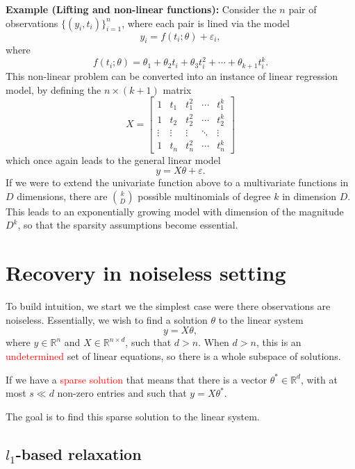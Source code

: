 \documentclass[10pt,handout,english]{beamer}
\newcommand{\R}{\mathbb{R}}
\begin{document}
\begin{frame}[allowframebreaks]
\textbf{Example (Lifting and non-linear functions):} Consider the $n$ pair of observations $\{(y_i,t_i)\}_{i=1}^n$, where each pair is lined via the model 
\[
y_i=f(t_i;\theta)+\varepsilon_i,
\]
where 
\[
f(t_i;\theta)=\theta_1+\theta_2t_i+\theta_3t_i^2+\cdots+\theta_{k+1}t_i^k.
\]
This non-linear problem can be converted into an instance of linear regression model, by defining the $n\times(k+1)$ matrix
\[
X=
\begin{bmatrix}
1&t_1&t_1^2&\cdots&t_1^k\\
1&t_2&t_2^2&\cdots&t_2^k\\
\vdots&\vdots&\vdots&\ddots&\vdots\\
1&t_n&t_n^2&\cdots&t_n^k
\end{bmatrix}
\]
which once again leads to the general linear model
\[
y=X\theta+\varepsilon.
\]
If we were to extend the univariate function above to a multivariate functions in  $D$ dimensions, there are $\binom{k}{D}$ possible multinomials of degree $k$ in dimension $D$. This leads to an exponentially growing model with dimension of the magnitude $D^k$, so that the sparsity assumptions become essential.
\end{frame}

\section{Recovery in noiseless setting}
\frame{\tableofcontents[currentsection]}

\begin{frame}[allowframebreaks]
To build intuition, we start we the simplest case were there observations are noiseless. Essentially, we wish to find a solution $\theta$ to the linear system
\[
y=X\theta,
\]
where $y\in\R^n$ and $X\in\R^{n\times d}$, such that $d>n$. When $d>n$, this is an \textcolor{red}{undetermined} set of linear equations, so there is a whole subspace of solutions. 

If we have a \textcolor{red}{sparse solution} that means that there is a vector $\theta^*\in\R^d$, with at most $s\ll d$ non-zero entries and such that $y=X\theta^*$.

The goal is to find this sparse solution to the linear system.
\end{frame}

\subsection{$l_1$-based relaxation}
\end{document}
